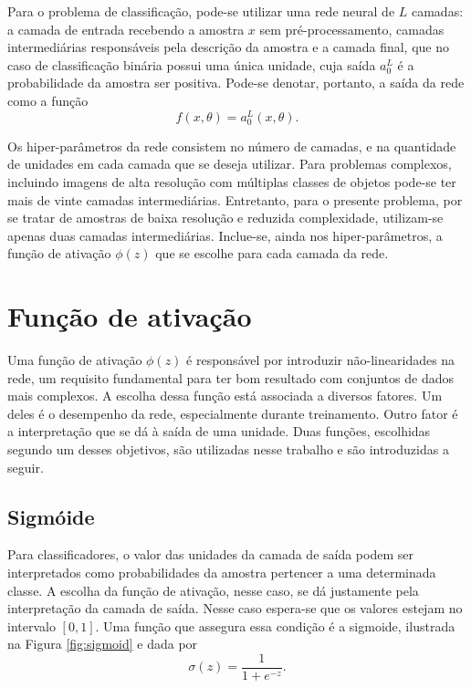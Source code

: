 Para o problema de classificação, pode-se utilizar uma rede neural de $L$ camadas: a camada de entrada recebendo a amostra $x$ sem pré-processamento, camadas intermediárias responsáveis pela descrição da amostra e a camada final, que no caso de classificação binária possui uma única unidade, cuja saída $a^L_0$ é a probabilidade da amostra ser positiva. Pode-se denotar, portanto, a saída da rede como a função
\begin{equation}
f(x, \theta) = a^L_0(x, \theta).
\end{equation}

Os hiper-parâmetros da rede consistem no número de camadas, e na quantidade de unidades em cada camada que se deseja utilizar. Para problemas complexos, incluindo imagens de alta resolução com múltiplas classes de objetos pode-se ter mais de vinte camadas intermediárias. Entretanto, para o presente problema, por se tratar de amostras de baixa resolução e reduzida complexidade, utilizam-se apenas duas camadas intermediárias. Inclue-se, ainda nos hiper-parâmetros, a função de ativação $\phi(z)$ que se escolhe para cada camada da rede.

\section{Função de ativação}
\label{sec:funcao-ativacao}
Uma função de ativação $\phi(z)$ é responsável por introduzir não-linearidades na rede, um requisito fundamental para ter bom resultado com conjuntos de dados mais complexos. A escolha dessa função está associada a diversos fatores. Um deles é o desempenho da rede, especialmente durante treinamento. Outro fator é a interpretação que se dá à saída de uma unidade. Duas funções, escolhidas segundo um desses objetivos, são utilizadas nesse trabalho e são introduzidas a seguir.

\subsection{Sigmóide}
Para classificadores, o valor das unidades da camada de saída podem ser interpretados como probabilidades da amostra pertencer a uma determinada classe. A escolha da função de ativação, nesse caso, se dá justamente pela interpretação da camada de saída. Nesse caso espera-se que os valores estejam no intervalo $[0,1]$. Uma função que assegura essa condição é a sigmoide, ilustrada na Figura \ref{fig:sigmoid} e dada por
\begin{equation}
	\label{eq:sigm}
	\sigma(z) = \frac{1}{1+e^{-z}}.
\end{equation}

